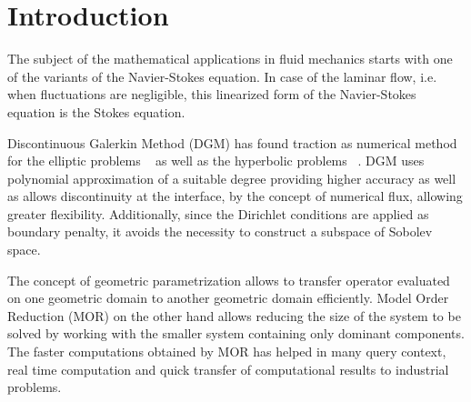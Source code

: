 \documentclass[graybox]{svmult}
\begin{document}

\section{Introduction}
\label{introduction}

The subject of the mathematical applications in fluid mechanics starts with one of the variants of the Navier-Stokes equation. In case of the laminar flow, i.e. when fluctuations are negligible, this linearized form of the Navier-Stokes equation is the Stokes equation.

Discontinuous Galerkin Method (DGM) has found traction as numerical method for the elliptic problems ~\cite{peraire} as well as the hyperbolic problems ~\cite{hyperbolic}. DGM uses polynomial approximation of a suitable degree providing higher accuracy as well as allows discontinuity at the interface, by the concept of numerical flux, allowing greater flexibility. Additionally, since the Dirichlet conditions are applied as boundary penalty, it avoids the necessity to construct a subspace of Sobolev space.

The concept of geometric parametrization allows to transfer operator evaluated on one geometric domain to another geometric domain efficiently. Model Order Reduction (MOR) on the other hand allows reducing the size of the system to be solved by working with the smaller system containing only dominant components. The faster computations obtained by MOR has helped in many query context, real time computation and quick transfer of computational results to industrial problems.
\end{document}

